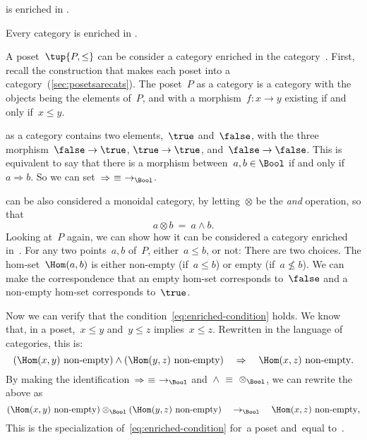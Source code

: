 \begin{example}
  \Category is enriched in \Category.
\end{example}

\begin{example}
  Every category is enriched in \Set.
\end{example}


\begin{example}
  A poset~$\tup{P, \leq}$ can be consider a category enriched in the
  category~\Bool. First, recall the construction that makes each poset into a
  category~(\cref{sec:posetsarecats}). The poset~$P$ as a category is a category with the objects being the
  elements of~$P$, and with a morphism~$f\colon x \to y$ existing if and only if~$x\leq y$.

  \Bool as a category contains two elements,~$\true$ and~$\false$, with
  the three morphism~$\false \to \true$, $\true \to \true$, and~$\false \to \false$. This is equivalent to say that there is a morphism between~$a, b \in \Bool$ if and only if~$a \Rightarrow b$. So we can set~$\Rightarrow\ \equiv\ \to_{\Bool}$.

  \Bool can be also considered a monoidal category, by letting~$\otimes$ be
  the \emph{and} operation, so that
  \begin{equation}
    a \otimes b\ =\ a \wedge b.
  \end{equation}
  Looking at~$P$ again, we can show how it can be considered a category enriched in~\Bool. For any two points~$a, b$ of~$P$, either~$a \leq b$, or not: There are two choices. The hom-set~$\Hom(a, b)$ is either non-empty
  (if~$a \leq b$) or empty (if~$a \not\leq b$). We can make the correspondence that an empty hom-set corresponds to~$\false$ and a non-empty hom-set corresponds to~$\true$.

  Now we can verify that the condition~\cref{eq:enriched-condition} holds. We
  know that, in a poset,~$x \leq y$ and~$y \leq z$ implies~$x \leq z$.
%
  Rewritten in the language of categories, this is:
  \begin{equation*}
  (\Hom(x,y)\ \text{non-empty})
    \wedge
    (\Hom(y, z)\ \text{non-empty})
    \quad
    \Rightarrow
    \quad
    \Hom(x, z)\ \text{non-empty}.
  \end{equation*}
  By making the identification~$\Rightarrow\ \equiv\ \to_{\Bool}$ and~$\wedge\ \equiv\ \otimes_{\Bool}$, we can rewrite the above as
  \begin{equation*}
  (\Hom(x,y)\ \text{non-empty})
    \otimes_{\Bool}
    (\Hom(y, z)\ \text{non-empty})
    \quad
    \to_{\Bool}
    \quad
    \Hom(x, z)\ \text{non-empty},
  \end{equation*}
  This is the specialization of~\cref{eq:enriched-condition}
  for~\CatC a poset and~\CatD equal to~\Bool.
\end{example}

